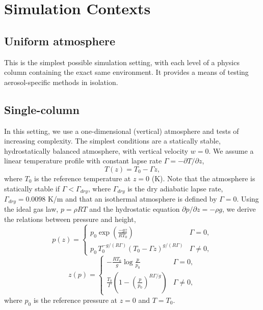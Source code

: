 \section{Simulation Contexts}

\subsection{Uniform atmosphere}

This is the simplest possible simulation setting, with each level of a physics column containing the exact same environment.  
It provides a means of testing aerosol-specific methods in isolation.

\subsection{Single-column}

In this setting, we use a one-dimensional (vertical) atmosphere and tests of increasing complexity.
The simplest conditions are a  statically stable, hydrostatically balanced atmosphere, with vertical velocity $w=0$.
We assume a linear temperature profile with constant lapse rate $\Gamma = -\partial T/\partial z$,
\begin{equation}
  T(z) = T_0 - \Gamma z,
\end{equation}
where $T_0$ is the reference temperature at $z=0$ (K).  
Note that the atmosphere is statically stable if $\Gamma < \Gamma_{dry}$, where $\Gamma_{dry}$ is the dry adiabatic lapse rate, $\Gamma_{dry} = 0.0098$ K/m and that an isothermal atmosphere is defined by $\Gamma = 0$.
Using the ideal gas law, $p = \rho R T$ and the hydrostatic equation $\partial p/\partial z = -\rho g$, we derive the relations between pressure and height,
\begin{equation}
  p(z) = \begin{cases}
          p_0\exp\left(\frac{-g z}{RT_0}\right) & \Gamma = 0,\\[0.5em]
          p_0\, T_0^{-g/(R\Gamma)}\left(T_0 - \Gamma z\right)^{g/(R\Gamma)} & \Gamma \ne 0,
        \end{cases}
\end{equation}
\begin{equation}
  z(p) = \begin{cases}
         -\frac{R T_0}{g}\log\frac{p}{p_0} & \Gamma = 0,\\[0.5em]
         \frac{T_0}{\Gamma}\left(1 - \left(\frac{p}{p_0}\right)^{R\Gamma/g}\right) & \Gamma \ne 0,
       \end{cases}
\end{equation}
where $p_0$ is the reference pressure at $z=0$ and $T=T_0$.

